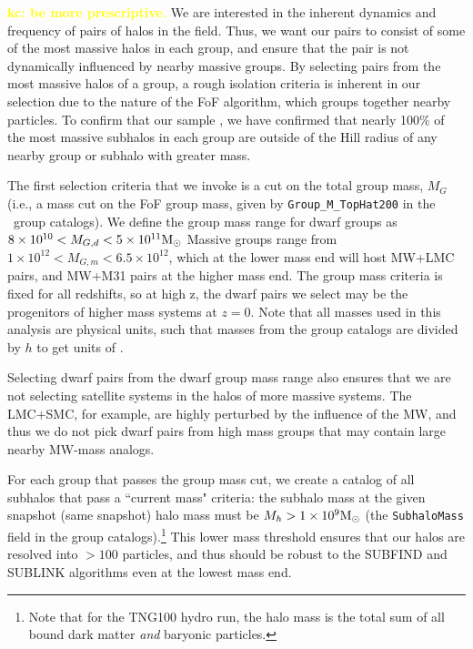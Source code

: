 \documentclass[twocolumn]{aastex631}
\newcommand{\kc}[1]{\textcolor{yellow}{\textbf{kc: #1}} }
\begin{document}
    \kc{be more prescriptive. }
    We are interested in the inherent dynamics and frequency of pairs of halos in the field.
    Thus, we want our pairs to consist of some of the most massive halos in each group, and ensure that the pair is not dynamically influenced by nearby massive groups. 
    By selecting pairs from the most massive halos of a group, a rough isolation criteria is inherent in our selection due to the nature of the FoF algorithm, which groups together nearby particles. 
    To confirm that our sample , we have confirmed that nearly 100\% of the most massive subhalos in each group are outside of the Hill radius of any nearby group or subhalo with greater mass.

    The first selection criteria that we invoke is a cut on the total group mass, $M_{G}$ (i.e., a mass cut on the FoF group mass, given by \texttt{Group\_M\_TopHat200} in the \tng\ group catalogs). 
    We define the group mass range for dwarf groups as $8\times 10^{10} < M_{G,d} < 5\times 10^{11}\mathrm{M}_\odot$
    Massive groups range from $1\times10^{12} < M_{G,m} < 6.5\times10^{12}$, which at the lower mass end will host MW+LMC pairs, and MW+M31 pairs at the higher mass end. 
    The group mass criteria is fixed for all redshifts, so at high z, the dwarf pairs we select may be the progenitors of higher mass systems at $z=0$.
    Note that all masses used in this analysis are physical units, such that masses from the group catalogs are divided by $h$ to get units of \Msun. 

    Selecting dwarf pairs from the dwarf group mass range also ensures that we are not selecting satellite systems in the halos of more massive systems. 
    The LMC+SMC, for example, are highly perturbed by the influence of the MW, and thus we do not pick dwarf pairs from high mass groups that may contain large nearby MW-mass analogs.
    
    For each group that passes the group mass cut, we create a catalog of all subhalos that pass a ``current mass" criteria: the subhalo mass at the given snapshot (same snapshot) halo mass must be $M_h > 1\times10^{9}\mathrm{M}_\odot$ (the \texttt{SubhaloMass} field in the group catalogs).\footnote{Note that for the TNG100 hydro run, the halo mass is the total sum of all bound dark matter \textit{and} baryonic particles.}
    This lower mass threshold ensures that our halos are resolved into $>100$ particles, and thus should be robust to the SUBFIND and SUBLINK algorithms even at the lowest mass end.  
    
\end{document}
